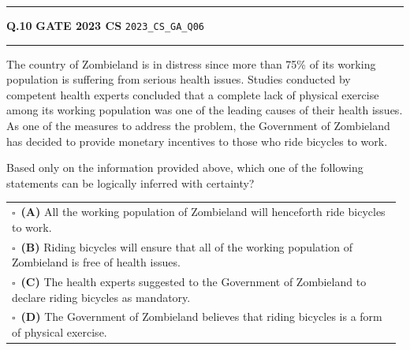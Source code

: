 \documentclass[a4paper,10pt]{article}
\begin{document}
\vspace{6pt}\hrule height 0.35pt\vspace{6pt}
\noindent
\begin{tcolorbox}[
    blanker,
    sidebyside,
    sidebyside align=top,
    lefthand width=0.55\textwidth,
    top=4pt, bottom=4pt, left=0pt, right=0pt,
    middle=16pt,
    underlay={
        \draw[dashed, black!80, line width=0.8pt, dash pattern=on 4pt off 3pt]
            ([xshift=0.55\textwidth+8pt]frame.north west) --
            ([xshift=0.55\textwidth+8pt]frame.south west);
    }
]
\textbf{Q.10}  \hfill {\footnotesize\textbf{GATE 2023 CS} \quad \tiny\texttt{2023\_CS\_GA\_Q06}}
\vspace{2pt}\hrule height 0.3pt\vspace{4pt}

The country of Zombieland is in distress since more than 75\% of its working population is suffering from serious health issues. Studies conducted by competent health experts concluded that a complete lack of physical exercise among its working population was one of the leading causes of their health issues. As one of the measures to address the problem, the Government of Zombieland has decided to provide monetary incentives to those who ride bicycles to work.
\par\medskip
Based only on the information provided above, which one of the following statements can be logically inferred with certainty?

\par\vspace{6pt}\noindent
\begin{tabular}{@{}p{0.98\linewidth}@{}}
$\square$\ \textbf{(A)} All the working population of Zombieland will henceforth ride bicycles to work. \\
\addlinespace[3pt]
$\square$\ \textbf{(B)} Riding bicycles will ensure that all of the working population of Zombieland is free of health issues. \\
\addlinespace[3pt]
$\square$\ \textbf{(C)} The health experts suggested to the Government of Zombieland to declare riding bicycles as mandatory. \\
\addlinespace[3pt]
$\square$\ \textbf{(D)} The Government of Zombieland believes that riding bicycles is a form of physical exercise.
\end{tabular}

\tcblower


\end{tcolorbox}
\end{document}
